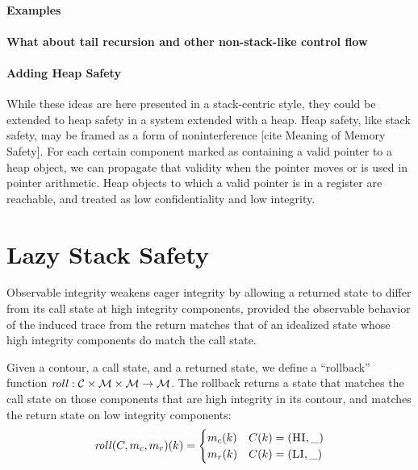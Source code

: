 \documentclass[acmsmall,review,anonymous]{acmart}\settopmatter{printfolios=true,printccs=false,printacmref=false}
\begin{document}
  \paragraph{Examples}


  \paragraph{What about tail recursion and other non-stack-like control flow}

  \paragraph{Adding Heap Safety}

    While these ideas are here presented in a stack-centric style, they could
    be extended to heap safety in a system extended with a heap. Heap safety,
    like stack safety, may be framed as a form of noninterference
    [cite Meaning of Memory Safety]. For each certain component marked as
    containing a valid pointer to a heap object, we can propagate that
    validity when the pointer moves or is used in pointer arithmetic. Heap
    objects to which a valid pointer is in a register are reachable, and
    treated as low confidentiality and low integrity.

\section{Lazy Stack Safety}
\label{sec:lazy}

      Observable integrity weakens eager integrity by allowing a returned state
      to differ from its call state at high integrity components, provided the
      observable behavior of the induced trace from the return matches that of
      an idealized state whose high integrity components do match the call
      state.

      Given a contour, a call state, and a returned state, we define a
      ``rollback'' function \(\mathit{roll} : {\mathcal C} \times {\mathcal M} \times
      {\mathcal M} \rightarrow {\mathcal M}\). The rollback returns a state that matches
      the call state on those components that are high integrity in its
      contour, and matches the return state on low integrity components:
      \[\mathit{roll}(C,m_c,m_r)(k) =
      \begin{cases}
        m_c(k) & C(k) = (\textsc{HI},\_) \\
        m_r(k) & C(k) = (\textsc{LI},\_) \\
      \end{cases}\]
\end{document}
